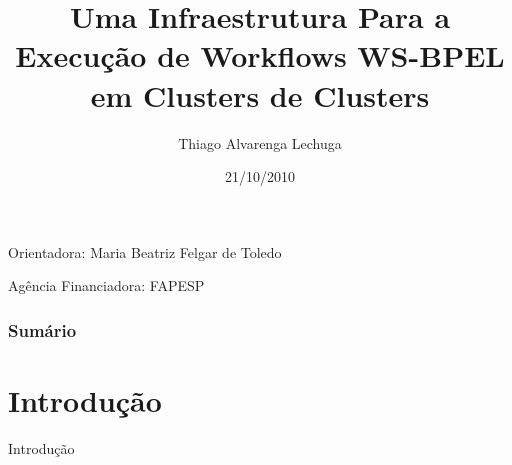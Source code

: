 \documentclass[red, cover=invisible, theme=Warsaw]{myslides}
\begin{document}

\title[Execução de Workflows WS-BPEL em CoCs]{Uma Infraestrutura Para a Execução de Workflows WS-BPEL em Clusters de Clusters}
\author{Thiago Alvarenga Lechuga}
\date{21/10/2010}

\begin{frame}
\titlepage
Orientadora: Maria Beatriz Felgar de Toledo

Agência Financiadora: FAPESP
\end{frame}

\begin{frame}[plain]\frametitle{Sumário}
\small\tableofcontents
\end{frame}



\section{Introdução}
	
    \begin{frame}
	\begin{center}
	{\Huge Introdução}
	\end{center}
    \end{frame}
    
\end{document}
